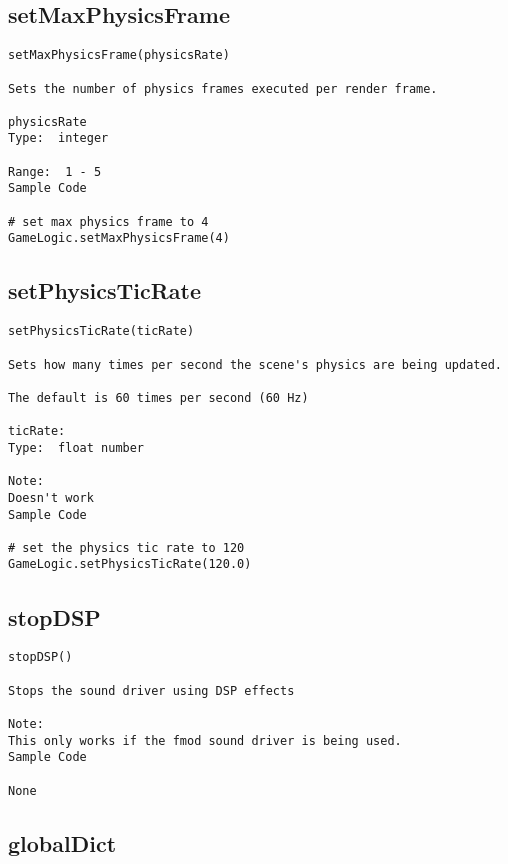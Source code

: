 \subsection{setMaxPhysicsFrame}
\begin{verbatim}
setMaxPhysicsFrame(physicsRate)

Sets the number of physics frames executed per render frame.

physicsRate
Type:  integer

Range:  1 - 5
Sample Code

# set max physics frame to 4
GameLogic.setMaxPhysicsFrame(4)
\end{verbatim}

\subsection{setPhysicsTicRate}
\begin{verbatim}
setPhysicsTicRate(ticRate)

Sets how many times per second the scene's physics are being updated.  

The default is 60 times per second (60 Hz)

ticRate:
Type:  float number

Note:
Doesn't work
Sample Code

# set the physics tic rate to 120
GameLogic.setPhysicsTicRate(120.0)
\end{verbatim}

\subsection{stopDSP}
\begin{verbatim}
stopDSP()

Stops the sound driver using DSP effects

Note:
This only works if the fmod sound driver is being used.
Sample Code

None
\end{verbatim}


\subsection{globalDict}

